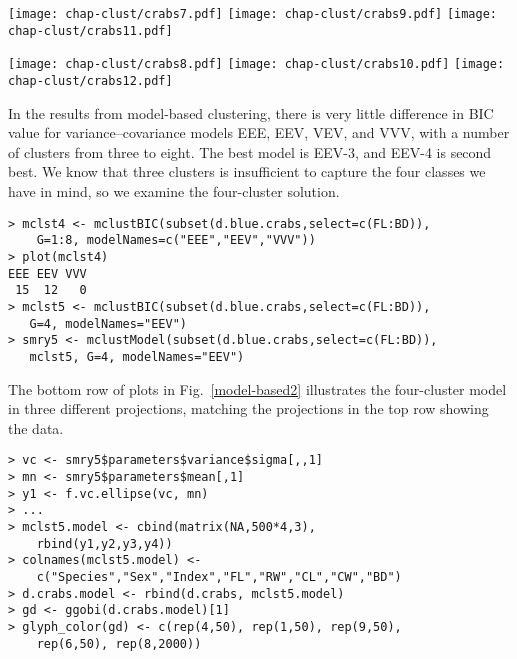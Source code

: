 \begin{figure*}[htbp]
\centerline{{\texttt{[image: chap-clust/crabs7.pdf]}}
 {\texttt{[image: chap-clust/crabs9.pdf]}}
 {\texttt{[image: chap-clust/crabs11.pdf]}}}
\smallskip
\centerline{{\texttt{[image: chap-clust/crabs8.pdf]}}
 {\texttt{[image: chap-clust/crabs10.pdf]}}
 {\texttt{[image: chap-clust/crabs12.pdf]}}}
\caption[Comparing the  data with results of
model-based clustering]{Comparing the  data
with results of model-based clustering using all variables.  Compare
the tour projections of the 5D data {\bf (top row)} with the 5D ellipses
corresponding to the variance--covariance in the four-cluster model
{\bf (bottom row)}. The ellipses of the four clusters do not match the four
known groups in the data.}
\label{model-based2}
\end{figure*}

In the results from model-based clustering, there is very little
difference in BIC value for variance--covariance models EEE, EEV, VEV,
and VVV, with a number of clusters from three to eight.  The best model is
EEV-3, and EEV-4 is second best. We know that three clusters is
insufficient to capture the four classes we have in mind, so we
examine the four-cluster solution. 

\begin{verbatim}
> mclst4 <- mclustBIC(subset(d.blue.crabs,select=c(FL:BD)),
    G=1:8, modelNames=c("EEE","EEV","VVV"))
> plot(mclst4)
EEE EEV VVV 
 15  12   0 
> mclst5 <- mclustBIC(subset(d.blue.crabs,select=c(FL:BD)), 
   G=4, modelNames="EEV")
> smry5 <- mclustModel(subset(d.blue.crabs,select=c(FL:BD)), 
   mclst5, G=4, modelNames="EEV")
\end{verbatim}

The bottom row of plots in Fig.~\ref{model-based2} illustrates the
four-cluster model in three different projections, matching the
projections in the top row showing the data.

\begin{verbatim}
> vc <- smry5$parameters$variance$sigma[,,1]
> mn <- smry5$parameters$mean[,1]
> y1 <- f.vc.ellipse(vc, mn)
> ...
> mclst5.model <- cbind(matrix(NA,500*4,3),
    rbind(y1,y2,y3,y4))
> colnames(mclst5.model) <-
    c("Species","Sex","Index","FL","RW","CL","CW","BD")
> d.crabs.model <- rbind(d.crabs, mclst5.model)
> gd <- ggobi(d.crabs.model)[1]
> glyph_color(gd) <- c(rep(4,50), rep(1,50), rep(9,50), 
    rep(6,50), rep(8,2000))
\end{verbatim}

